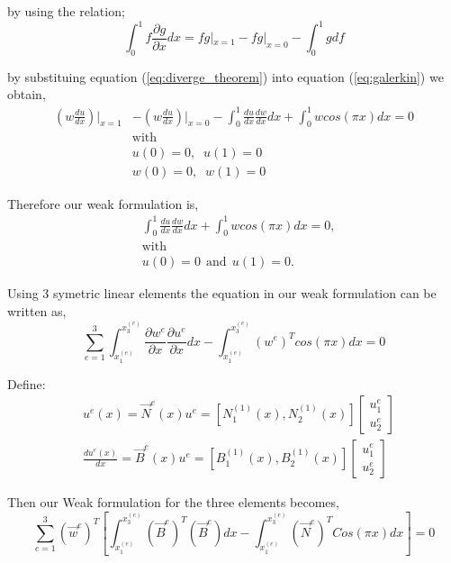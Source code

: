 \documentclass[a4paper]{memoir}
\begin{document}
by using the relation;
\begin{equation}
	\int_0^1 f \frac{\partial g}{\partial x}dx = fg|_{x=1} - fg|_{x=0} - \int_0^1 g df
	\label{eq:diverge_theorem}
\end{equation}

by substituing equation (\ref{eq:diverge_theorem}) into equation (\ref{eq:galerkin}) we obtain,
\begin{align*}
		\left( w\frac{du}{dx}\right)|_{x=1} &-\left( w\frac{du}{dx}\right)|_{x=0} - \int_0^1 \frac{du}{dx}\frac{dw}{dx}dx +\int_0^1 w cos(\pi x) dx = 0 \\
		& \text{with} \\
		& u(0) = 0, \;\; u(1)=0 \\
		& w(0) = 0, \;\; w(1)=0 
\end{align*}

Therefore our weak formulation is,
\begin{align*}
	&\int_0^1 \frac{du}{dx}\frac{dw}{dx}dx + \int_0^1 w cos(\pi x) dx = 0, \\
	& \text{with} \\
	& u(0) = 0 \:\: \text{and} \:\: u(1) = 0.
\end{align*}

Using 3 symetric linear elements the equation in our weak formulation can be written as,
\begin{equation}
	\sum_{e=1}^3 \int_{x_1^{(e)}}^{x_3^{(e)}} \frac{\partial w^e}{\partial x} \frac{\partial u^e}{\partial x} dx - 
		\int_{x_1^{(e)}}^{x_3^{(e)}} (w^e)^T cos(\pi x) dx = 0
\end{equation}

Define:
\begin{align*}
	& u^e(x) = \vec{N}^e(x) u^e = [N_1^{(1)}(x),N_2^{(1)}(x)]
	\begin{bmatrix}
		u_1^e \\
		u_2^e
	\end{bmatrix} \\
	& \frac{du^e(x)}{dx} = \vec{B}^e(x) u^e = [B_1^{(1)}(x),B_2^{(1)}(x)] 
	\begin{bmatrix}
		u_1^e \\
		u_2^e
	\end{bmatrix}
\end{align*}

Then our Weak formulation for the three elements becomes,
\begin{equation}
	\sum_{e=1}^3 (\vec{w}^{e})^T \left[ \int_{x_1^{(e)}}^{x_3^{(e)}} (\vec{B}^e)^T (\vec{B}^e) dx - \int_{x_1^{(e)}}^{x_3^{(e)}} (\vec{N}^e)^T Cos(\pi x) dx \right] = 0
\end{equation}
\end{document}
